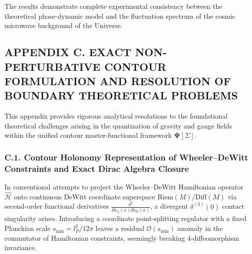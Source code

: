 The results demonstrate complete experimental consistency between the theoretical phase-dynamic model and the fluctuation spectrum of the cosmic microwave background of the Universe.

\clearpage
\clearpage
\subsection*{APPENDIX C. EXACT NON-PERTURBATIVE CONTOUR FORMULATION AND RESOLUTION OF BOUNDARY THEORETICAL PROBLEMS}

This appendix provides rigorous analytical resolutions to the foundational theoretical challenges arising in the quantization of gravity and gauge fields within the unified contour master-functional framework $\mathbf{\Psi}[\Sigma]$.

\subsubsection*{C.1. Contour Holonomy Representation of Wheeler--DeWitt Constraints and Exact Dirac Algebra Closure}

In conventional attempts to project the Wheeler--DeWitt Hamiltonian operator $\hat{\mathcal{H}}$ onto continuous DeWitt coordinate superspace $\text{Riem}(M)/\text{Diff}(M)$ via second-order functional derivatives $\frac{\delta^2}{\delta h_{ij}(x)\delta h_{kl}(x)}$, a divergent $\delta^{(3)}(0)$ contact singularity arises. Introducing a coordinate point-splitting regulator with a fixed Planckian scale $s_{\text{min}} = l_P^2/12\pi$ leaves a residual $\mathcal{O}(s_{\text{min}})$ anomaly in the commutator of Hamiltonian constraints, seemingly breaking 4-diffeomorphism invariance.

